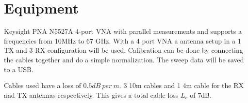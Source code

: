 %
%
%



\section{Equipment}
Keysight PNA N5527A 4-port VNA with parallel measurements and supports a frequencies from 10MHz to 67 GHz. With a 4 port VNA a antenna setup in a 1 TX and 3 RX configuration will be used. Calibration can be done by connecting the cables together and do a simple normalization. The sweep data will be saved to a USB.


Cables used have a loss of $0.5dB  \ per \ m$. 3 10m cables and 1 4m cable for the RX and TX antennas respectively. This gives a total cable loss $L_c$ of 7dB.

